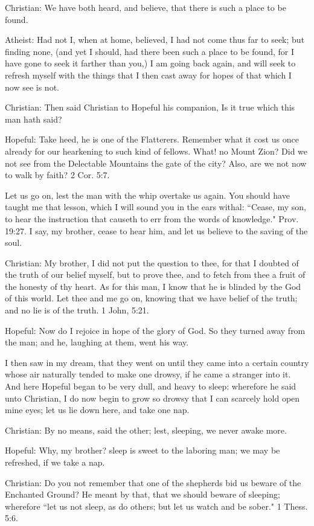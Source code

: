 Christian: We have both heard, and believe, that there is such a place to be found.

Atheist: Had not I, when at home, believed, I had not come thus far to seek; but finding none, (and yet I should, had there been such a place to be found, for I have gone to seek it farther than you,) I am going back again, and will seek to refresh myself with the things that I then cast away for hopes of that which I now see is not.

Christian: Then said Christian to Hopeful his companion, Is it true which this man hath said?

Hopeful: Take heed, he is one of the Flatterers. Remember what it cost us once already for our hearkening to such kind of fellows. What! no Mount Zion? Did we not see from the Delectable Mountains the gate of the city? Also, are we not now to walk by faith? 2 Cor. 5:7.

Let us go on, lest the man with the whip overtake us again. You should have taught me that lesson, which I will sound you in the ears withal: ``Cease, my son, to hear the instruction that causeth to err from the words of knowledge." Prov. 19:27. I say, my brother, cease to hear him, and let us believe to the saving of the soul.

Christian: My brother, I did not put the question to thee, for that I doubted of the truth of our belief myself, but to prove thee, and to fetch from thee a fruit of the honesty of thy heart. As for this man, I know that he is blinded by the God of this world. Let thee and me go on, knowing that we have belief of the truth; and no lie is of the truth. 1 John, 5:21.

Hopeful: Now do I rejoice in hope of the glory of God. So they turned away from the man; and he, laughing at them, went his way.

I then saw in my dream, that they went on until they came into a certain country whose air naturally tended to make one drowsy, if he came a stranger into it. And here Hopeful began to be very dull, and heavy to sleep: wherefore he said unto Christian, I do now begin to grow so drowsy that I can scarcely hold open mine eyes; let us lie down here, and take one nap.

Christian: By no means, said the other; lest, sleeping, we never awake more.

Hopeful: Why, my brother? sleep is sweet to the laboring man; we may be refreshed, if we take a nap.

Christian: Do you not remember that one of the shepherds bid us beware of the Enchanted Ground? He meant by that, that we should beware of sleeping; wherefore ``let us not sleep, as do others; but let us watch and be sober." 1 Thess. 5:6.

